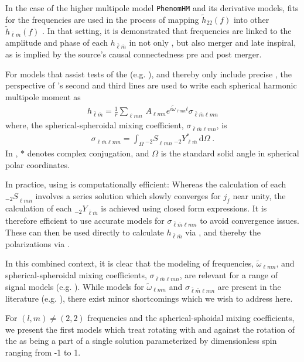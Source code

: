 \documentclass[twocolumn,aps,prd,floatfix,preprintnumbers,a4paper,nofootinbib,
superscriptaddress,10pt]{revtex4-1}
\newcommand{\cw}{\tilde{\omega}}
\def\jf{j_f}
\def\lmn{_{\ell m n}}
\def\LM{_{\bar{\ell} \bar{m}}}
\def\LMlmn{_{\bar{\ell} \bar{m} \ell m n}}
\begin{document}
%
In the case of the higher multipole model \texttt{PhenomHM} and its derivative models, fits for the \qnm{} frequencies are used in the process of mapping $\tilde{h}_{22}(f)$ into other $\tilde{h}\LM(f)$ \cite{London:2017bcn}.
%
In that setting, it is demonstrated that \qnm{} frequencies are linked to the amplitude and phase of each $h\LM$ in not only \rd{}, but also merger and late inspiral, as is implied by the source's causal connectedness pre and post merger.
%
%
\par For models that assist tests of the \nht{} (e.g. \cite{Berti:2005ys,London:2018gaq,Carullo:2018sfu}), and thereby only include precise , the perspective of 's second and third lines are used to write each spherical harmonic multipole moment as
%
\begin{align}
	\label{hlm}
	h\LM = \frac{1}{r} \sum\lmn \, A\lmn e^{i \cw\lmn t} \sigma\LMlmn
\end{align}
%
where, the spherical-spheroidal mixing coefficient, $\sigma\LMlmn$, is
%
\begin{align}
		\label{sigma}
		\sigma\LMlmn = \int_{\Omega} {_{-2}S}\lmn \,  {_{-2}}Y^*\LM \, \mathrm{d} \Omega \; .
\end{align}
%
In , $*$ denotes complex conjugation, and $\Omega$ is the standard solid angle in spherical polar coordinates.
%
\par In practice, using  is computationally efficient:
%
Whereas the calculation of each ${_{-2}S}\lmn$ involves a series solution which slowly converges for $\jf$ near unity, the calculation of each ${_{-2}Y}\LM$ is achieved using closed form expressions.
%
It is therefore efficient to use accurate models for $\sigma\LMlmn$ to avoid convergence issues. These can then be used directly to calculate $h\LM$ via , and thereby the \gw{} polarizations via .
%
%
\par In this combined context, it is clear that the modeling of \qnm{} frequencies, $\cw\lmn$, and spherical-spheroidal mixing coefficients, $\sigma\LMlmn$, are relevant for a range of \gw{} signal models (e.g. \cite{Mehta:2019wxm}).
%
While models for $\cw\lmn$ and $\sigma\LMlmn$ are present in the literature (e.g. \cite{Berti:2005ys, Berti:2014fga, Cook:2014cta}), there exist minor shortcomings which we wish to address here.
%
\par For $(l,m)\neq(2,2)$ \qnm{} frequencies and the spherical-sphoidal mixing coefficients, we present the first models which treat  rotating with and against the rotation of the \bh{} as being a part of a single solution parameterized by dimensionless \bh{} spin ranging from -1 to 1.
\end{document}
